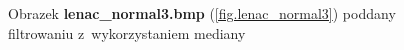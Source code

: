 \documentclass{classrep}
\begin{document}
\begin{figure}
{{  \label{fig.lenac_normal3_median_5x5}
 }
}
\caption{Obrazek \textbf{lenac\_normal3.bmp} (\ref{fig.lenac_normal3}) poddany filtrowaniu z~wykorzystaniem mediany}
\label{fig.lenac_normal3_median}
\end{figure}
\end{document}
